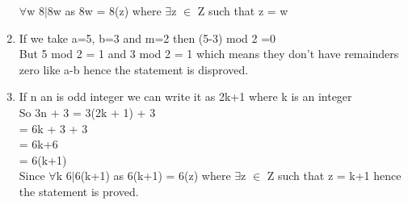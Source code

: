 \documentclass{article}
\begin{document}
\begin{enumerate}
$\forall$w 8$|$8w as 8w = 8(z) where $\exists$z $\in$ Z such that z = w
\item %
If we take a=5, b=3 and m=2 then (5-3) mod 2 =0 \\
But 5 mod 2 = 1 and 3 mod 2 = 1 which means they don't have remainders zero like a-b hence the statement is disproved. 
\item %
If n an is odd integer we can write it as 2k+1 where k is an integer \\
So 3n + 3 = 3(2k + 1) + 3 \\= 6k + 3 + 3 \\= 6k+6 \\= 6(k+1) \\
Since  $\forall$k 6$|$6(k+1) as 6(k+1) = 6(z) where $\exists$z $\in$ Z such that z = k+1 hence the statement is proved.
\end{enumerate}
\end{document}

